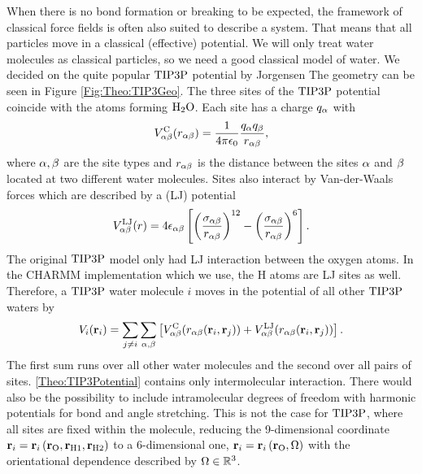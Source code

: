 When there is no bond formation or breaking to be expected, the framework of
classical force fields is often also suited to describe a system.
That means that
all particles move in a classical (effective) potential.
We will only treat water molecules as classical particles, so we need a good
classical model of water. We decided on the quite popular $\text{TIP3P}$ potential 
by Jorgensen \etal \cite{Jorgensen1983TIP3P} The geometry can be
seen in Figure \ref{Fig:Theo:TIP3Geo}. The three sites of the $\text{TIP3P}$ potential
coincide with the atoms forming $\text H _2 \text O$. Each site has a charge $q_{\alpha}$ with 
\begin{equation}
V^{\text C}_{\alpha\beta}(r_{\alpha\beta})=\frac{1}{4\pi\epsilon_0}\frac{q_{\alpha}q_{\beta}}{r_{\alpha\beta}},
\label{Theo:TIP3EC}
\end{equation}
where $\alpha,\beta$ are the site types and $r_{\alpha\beta}$ is the distance between
the sites $\alpha$ and $\beta$ located at two different water molecules. Sites also
interact by Van-der-Waals forces which are described by a 
(LJ) potential \newcommand\ELJ{\enmat V^{\te{LJ}}_{\al\be}}
\newcommand\salbe{\enmat{\si_{\al\be}}}
\newcommand\ealbe{\enmat{\eps_{\al\be}}}
\begin{equation}
\ELJ(r)=4\ealbe\ed{\rb{\frac{\salbe}{\ralbe}}^{12}-\rb{\frac{\salbe}{\ralbe}}^{6}}.
\label{Theo:TIP3ELJ}
\end{equation}
The original $\text{TIP3P}$ model only had LJ interaction between the oxygen atoms. In
the CHARMM implementation which we use, the H atoms are LJ
sites as well.\cite{CHARMM2009}
Therefore, a $\text{TIP3P}$ water molecule $i$ moves in the potential of all other $\text{TIP3P}$ waters by
\begin{equation}
V_i(\r_i)=\sum_{j\neq i} \sum_{\al,\be} \ed{\EC(\ralbe(\r_i,\r_j)) + \ELJ(\ralbe(\r_i,\r_j))}.
\label{Theo:TIP3Potential}
\end{equation}
The first sum runs over all other water molecules and the second over all
pairs of sites. \eqref{Theo:TIP3Potential} contains only
intermolecular interaction. There would also be the possibility to include intramolecular degrees of freedom with
harmonic potentials for bond and angle stretching. This is not the case for $\text{TIP3P}$,
where all sites are fixed within the molecule, reducing the 9-dimensional coordinate
\mbox{$\mathbf{r}_i=\mathbf{r}_i\left({\mathbf{r}_{\text O},\mathbf{r}_{\text H1},\mathbf{r}_{\text H2}}\right)$} to a 6-dimensional one, \mbox{$\mathbf{r}_i=\mathbf{r}_i\left({\mathbf{r}_{\text O},\Omega}\right)$}
with the orientational dependence described by $\Omega\in\mathbb{R}^3$.

